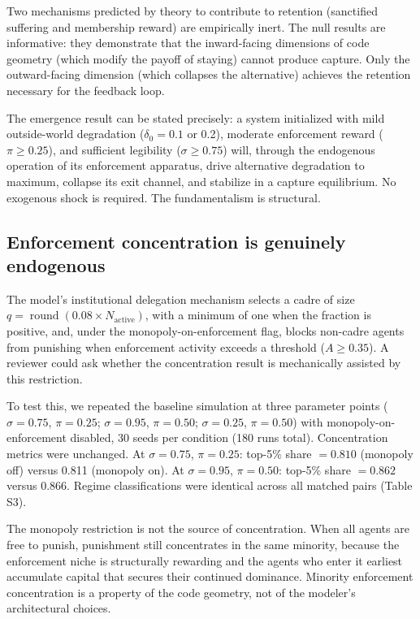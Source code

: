 \documentclass[12pt]{article}
\begin{document}
Two mechanisms predicted by theory to contribute to retention (sanctified suffering and membership reward) are empirically inert. The null results are informative: they demonstrate that the inward-facing dimensions of code geometry (which modify the payoff of staying) cannot produce capture. Only the outward-facing dimension (which collapses the alternative) achieves the retention necessary for the feedback loop.

The emergence result can be stated precisely: a system initialized with mild outside-world degradation ($\delta_0 = 0.1$ or 0.2), moderate enforcement reward ($\pi \geq 0.25$), and sufficient legibility ($\sigma \geq 0.75$) will, through the endogenous operation of its enforcement apparatus, drive alternative degradation to maximum, collapse its exit channel, and stabilize in a capture equilibrium. No exogenous shock is required. The fundamentalism is structural.

\subsection{Enforcement concentration is genuinely endogenous}

The model's institutional delegation mechanism selects a cadre of size $q = \operatorname{round}(0.08 \times N_{\text{active}})$, with a minimum of one when the fraction is positive, and, under the monopoly-on-enforcement flag, blocks non-cadre agents from punishing when enforcement activity exceeds a threshold ($A \geq 0.35$). A reviewer could ask whether the concentration result is mechanically assisted by this restriction.

To test this, we repeated the baseline simulation at three parameter points ($\sigma = 0.75$, $\pi = 0.25$; $\sigma = 0.95$, $\pi = 0.50$; $\sigma = 0.25$, $\pi = 0.50$) with monopoly-on-enforcement disabled, 30 seeds per condition (180 runs total). Concentration metrics were unchanged. At $\sigma = 0.75$, $\pi = 0.25$: top-5\% share $= 0.810$ (monopoly off) versus 0.811 (monopoly on). At $\sigma = 0.95$, $\pi = 0.50$: top-5\% share $= 0.862$ versus 0.866. Regime classifications were identical across all matched pairs (Table S3).

The monopoly restriction is not the source of concentration. When all agents are free to punish, punishment still concentrates in the same minority, because the enforcement niche is structurally rewarding and the agents who enter it earliest accumulate capital that secures their continued dominance. Minority enforcement concentration is a property of the code geometry, not of the modeler's architectural choices.
\end{document}
